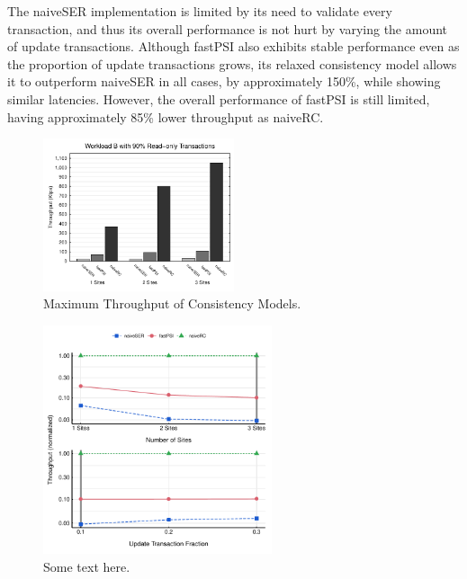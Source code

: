The naiveSER implementation is limited by its need to validate every transaction, and thus its overall performance is not hurt by varying the amount of update transactions. Although fastPSI also exhibits stable performance even as the proportion of update transactions grows, its relaxed consistency model allows it to outperform naiveSER in all cases, by approximately 150\%, while showing similar latencies. However, the overall performance of fastPSI is still limited, having approximately 85\% lower throughput as naiveRC.



\begin{figure}[h]
\begin{center}
\includegraphics[width=0.5\textwidth]{figures/sites_bench.pdf}
\vspace{-1cm}
\end{center}
\caption{Maximum Throughput of Consistency Models.}
\label{fig:site_bench}
\end{figure}

\begin{figure}[htb!]
\begin{center}
\includegraphics[width=0.6\textwidth]{figures/dynamic_bench.pdf}
\vspace{-0.5cm}
\end{center}
\caption{Some text here.}
\label{fig:dynamic_bench}
\end{figure}

